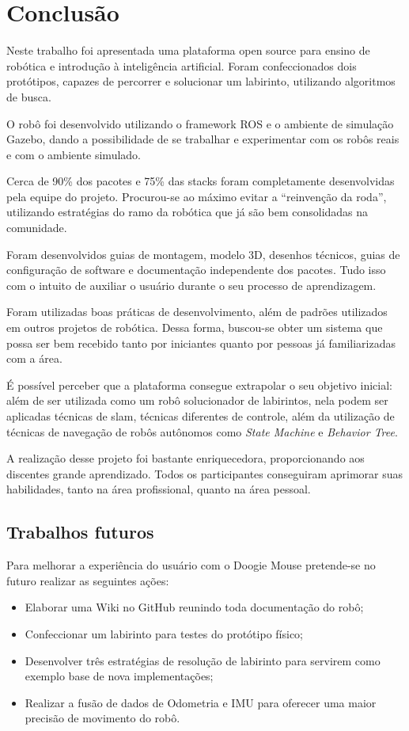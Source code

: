 \chapter{Conclusão}
\label{chap:conc}

Neste trabalho foi apresentada uma plataforma open source para ensino de robótica e introdução à inteligência artificial. Foram confeccionados dois protótipos, capazes de percorrer e solucionar um labirinto, utilizando algoritmos de busca.

O robô foi desenvolvido utilizando o framework ROS e o ambiente de simulação Gazebo, dando a possibilidade de se trabalhar e experimentar com os robôs reais e com o ambiente simulado.

Cerca de 90\% dos pacotes e 75\% das stacks foram completamente desenvolvidas pela equipe do projeto. Procurou-se ao máximo evitar a “reinvenção da roda”, utilizando estratégias do ramo da robótica que já são bem consolidadas na comunidade.

Foram desenvolvidos guias de montagem, modelo 3D, desenhos técnicos, guias de configuração de software e documentação independente dos pacotes. Tudo isso com o intuito de auxiliar o usuário durante o seu processo de aprendizagem.

Foram utilizadas boas práticas de desenvolvimento, além de padrões utilizados em outros projetos de robótica. Dessa forma, buscou-se obter um sistema que possa ser bem recebido tanto por iniciantes quanto por pessoas já familiarizadas com a área.

É possível perceber que a plataforma consegue extrapolar o seu objetivo inicial: além de ser utilizada como um robô solucionador de labirintos, nela podem ser aplicadas técnicas de \gls*{slam}, técnicas diferentes de controle, além da utilização de técnicas de navegação de robôs autônomos como \textit{State Machine} e \textit{Behavior Tree}. 

A realização desse projeto foi bastante enriquecedora, proporcionando aos discentes grande aprendizado. Todos os participantes conseguiram aprimorar suas habilidades, tanto na área profissional, quanto na área pessoal.

\section{Trabalhos futuros}
\label{sec:trabfut}
Para melhorar a experiência do usuário com o Doogie Mouse pretende-se no futuro realizar as seguintes ações:
\begin{itemize}
	\item Elaborar uma Wiki no GitHub reunindo toda documentação do robô;
	\item Confeccionar um labirinto para testes do protótipo físico;
	\item Desenvolver três estratégias de resolução de labirinto para servirem como exemplo base de nova implementações;
	\item Realizar a fusão de dados de Odometria e IMU para oferecer uma maior precisão de movimento do robô.
\end{itemize}
 

